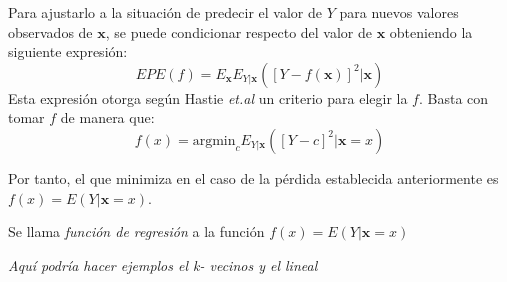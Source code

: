 \noindent Para ajustarlo a la situación de predecir el valor de $Y$ para nuevos valores observados de $\textbf{x}$, se puede condicionar respecto del valor de $\textbf{x}$ obteniendo la siguiente expresión:
\begin{equation}
 EPE(f) = E_{\textbf{x}} E_{Y|\textbf{x}}([Y-f(\textbf{x})]^2|\textbf{x})
\end{equation} 
Esta expresión otorga según Hastie \textit{et.al} \cite{Hastie 2001} un criterio para elegir la $f$. Basta con tomar $f$ de manera que: 
\begin{equation}
 f(x)=\text{argmin}_c E_{Y|\textbf{x}}([Y-c]^2|\textbf{x}=x)
\end{equation}

\noindent Por tanto, el que minimiza en el caso de la pérdida establecida anteriormente es $f(x)=E(Y|\textbf{x}=x)$. 
\begin{defi}
\noindent Se llama \textit{función de regresión} a la función $f(x)=E(Y|\textbf{x}=x)$
\end{defi}

\emph{Aquí podría hacer ejemplos el k- vecinos y el lineal}

